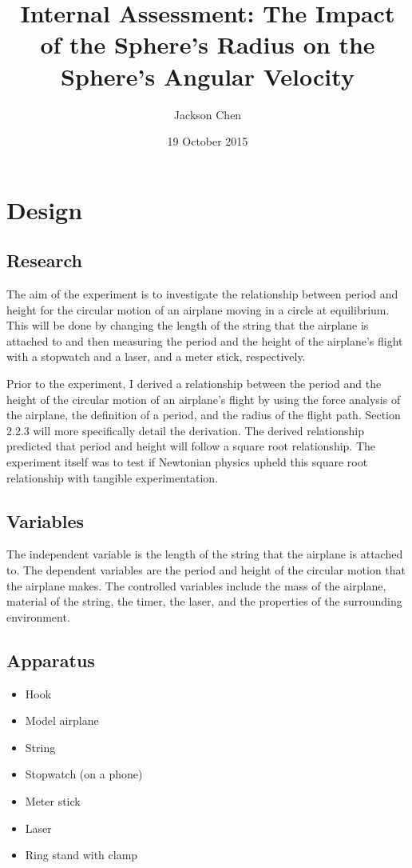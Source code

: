 \documentclass[10pt, letterpaper]{article}
\newcommand{\subtitle}[1]{%
  \posttitle{%
    \par\end{center}
    \begin{center}\large#1\end{center}
    \vskip0.5em}%
}
\begin{document}
\title{Internal Assessment: The Impact of the Sphere's Radius on the Sphere's Angular Velocity}
\subtitle {IB Physics II Period 6, Dr. Petach}
\date{19 October 2015}
\author{Jackson Chen}
\maketitle

\section{Design}

\subsection{Research}

The aim of the experiment is to investigate the relationship between period and height for the circular motion of an airplane
moving in a circle at equilibrium. This will be done by changing the length of the string that the airplane is attached to and then measuring
the period and the height of the airplane's flight with a stopwatch and a laser, and a meter stick, respectively.

Prior to the experiment, I derived a relationship between the period and the height of the circular motion of an airplane's flight
by using the force analysis of the airplane, the definition of a period, and the radius of the flight path. Section 2.2.3 will more
specifically detail the derivation. The derived relationship predicted that period and height will follow a square root relationship.
The experiment itself was to test if Newtonian physics upheld this square root relationship with tangible experimentation.

\subsection{Variables}
The independent variable is the length of the string that the airplane is attached to. The dependent variables are the
period and height of the circular motion that the airplane makes. The controlled variables include the mass of the airplane,
material of the string, the timer, the laser, and the properties of the surrounding environment.

\subsection{Apparatus}
\begin{itemize}
  \item Hook
  \item Model airplane
  \item String
  \item Stopwatch (on a phone)
  \item Meter stick
  \item Laser
  \item Ring stand with clamp
\end{itemize}
\end{document}
